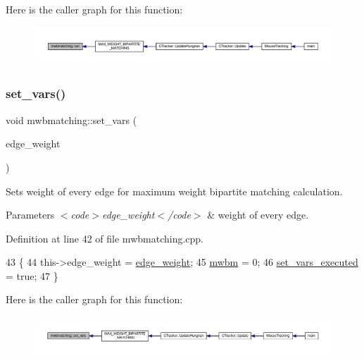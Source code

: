 Here is the caller graph for this function\+:\nopagebreak
\begin{figure}[H]
\begin{center}
\leavevmode
\includegraphics[width=350pt]{classmwbmatching_adcb51caed21e77253940cd71bfd9a405_icgraph}
\end{center}
\end{figure}
\mbox{\label{classmwbmatching_a0547cf2f00854d2548613c39eaf400a9}} 
\subsubsection{\texorpdfstring{set\+\_\+vars()}{set\_vars()}}
{\footnotesize\ttfamily void mwbmatching\+::set\+\_\+vars (\begin{DoxyParamCaption}\item[{const \mbox{\hyperlink{classedge__map}{edge\+\_\+map}}$<$ int $>$ \&}]{edge\+\_\+weight }\end{DoxyParamCaption})}

Sets weight of every edge for maximum weight bipartite matching calculation.


\begin{DoxyParams}{Parameters}
{\em $<$code$>$edge\+\_\+weight$<$/code$>$} & weight of every edge. \\
\hline
\end{DoxyParams}


Definition at line 42 of file mwbmatching.\+cpp.


\begin{DoxyCode}
43 \{
44     this->edge\_weight = \mbox{\hyperlink{classmwbmatching_a9624508c4944bffc6a349aa76ce6964c}{edge\_weight}};
45     \mbox{\hyperlink{classmwbmatching_a80e73b4ab7162ea265c48a93199fc172}{mwbm}} = 0;
46     \mbox{\hyperlink{classmwbmatching_ae871c52302b78ccf16a271ef099e0a3a}{set\_vars\_executed}} = \textcolor{keyword}{true};
47 \}
\end{DoxyCode}
Here is the caller graph for this function\+:\nopagebreak
\begin{figure}[H]
\begin{center}
\leavevmode
\includegraphics[width=350pt]{classmwbmatching_a0547cf2f00854d2548613c39eaf400a9_icgraph}
\end{center}
\end{figure}


